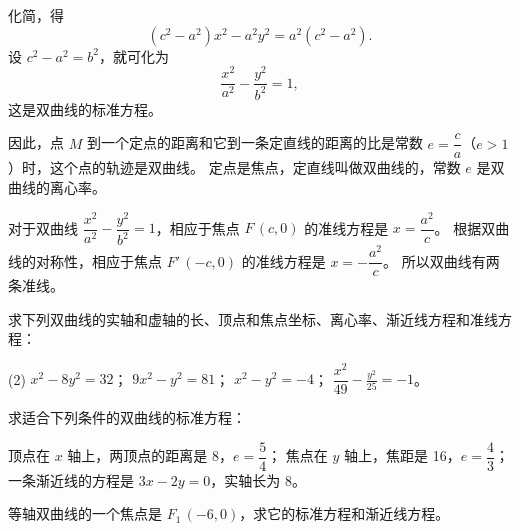 \medskip\noindent
化简，得
\[(c^2-a^2)x^2-a^2y^2=a^2(c^2-a^2).\]
设 $c^2-a^2=b^2$，就可化为
\[\frac{x^2}{a^2}-\frac{y^2}{b^2}=1,\]
这是双曲线的标准方程。

因此，点 $M$ 到一个定点的距离和它到一条定直线的距离的比是常数 $e=\dfrac{c}{a}$（$e>1$）时，这个点的轨迹是双曲线。
定点是焦点，定直线叫做双曲线的，常数 $e$ 是双曲线的离心率。

对于双曲线 $\dfrac{x^2}{a^2}-\dfrac{y^2}{b^2}=1$，相应于焦点 $F\,(c,0)$ 的准线方程是 $x=\dfrac{a^2}{c}$。
根据双曲线的对称性，相应于焦点 $F'\,(-c,0)$ 的准线方程是 $x=-\dfrac{a^2}{c}$。
所以双曲线有两条准线。

\begin{Practice}
  \begin{question}
    \item 求下列双曲线的实轴和虚轴的长、顶点和焦点坐标、离心率、渐近线方程和准线方程：
    \begin{tasks}(2)
      \task $x^2-8y^2=32$；
      \task $9x^2-y^2=81$；
      \task $x^2-y^2=-4$；
      \task $\dfrac{x^2}{49}-\frac{y^2}{25}=-1$。
    \end{tasks}
    \item 求适合下列条件的双曲线的标准方程：
    \begin{tasks}
      \task 顶点在 $x$ 轴上，两顶点的距离是 8，$e=\dfrac{5}{4}$；
      \task 焦点在 $y$ 轴上，焦距是 16，$e= \dfrac{4}{3}$；
      \task 一条渐近线的方程是 $3x-2y=0$，实轴长为 8。
    \end{tasks}
    \item 等轴双曲线的一个焦点是 $F_1\,(-6,0)$，求它的标准方程和渐近线方程。
  \end{question}
\end{Practice}
